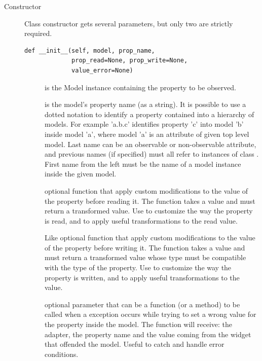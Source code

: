 \begin{description}
\item [Constructor] Class constructor gets several parameters, but
  only two are strictly required.
{
\codesize
\begin{verbatim}
def __init__(self, model, prop_name, 
             prop_read=None, prop_write=None, 
             value_error=None)
\end{verbatim}
}

\begin{description}
  \item [] is the Model instance containing the
    property to be observed.

  \item [] is the model's property name (as a
    string). It is possible to use a dotted notation to identify a
    property contained into a hierarchy of models. For example
    'a.b.c' identifies property 'c' into model 'b' inside model 'a',
    where model 'a' is an attribute of given top level model. Last
    name can be an observable or non-observable attribute, and
    previous names (if specified) must all refer to instances of
    class . First name from the left must be the
    name of a model instance inside the given model.

  \item [] optional function that apply custom
    modifications to the value of the property before reading
    it. The function takes a value and must return a transformed
    value. Use to customize the way the property is read, and to
    apply useful transformations to the read value.

  \item [] Like  optional
    function that apply custom modifications to the value of the
    property before writing it. The function takes a value and must
    return a transformed value whose type must be compatible with
    the type of the property. Use to customize the way the property
    is written, and to apply useful transformations to the value.

  \item [] optional parameter that can be a
    function (or a method) to be called when a 
    exception occurs while trying to set a wrong value for the
    property inside the model. The function will receive: the
    adapter, the property name and the value coming from the widget
    that offended the model. Useful to catch and handle error
    conditions.


\end{description}
\end{description}
